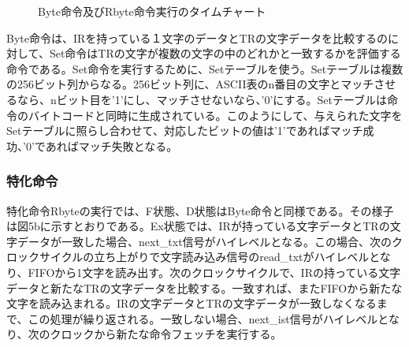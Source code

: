 \documentclass[submit,techrep]{ipsj}
\begin{document}
\begin{figure}[h]
       \caption{Byte命令及びRbyte命令実行のタイムチャート }
\end{figure}

Byte命令は、IRを持っている１文字のデータとTRの文字データを比較するのに対して、Set命令はTRの文字が複数の文字の中のどれかと一致するかを評価する命令である。Set命令を実行するために、Setテーブルを使う。Setテーブルは複数の256ビット列からなる。256ビット列に、ASCII表のn番目の文字とマッチさせるなら、nビット目を'1'にし、マッチさせないなら、'0'にする。Setテーブルは命令のバイトコードと同時に生成されている。このようにして、与えられた文字をSetテーブルに照らし合わせて、対応したビットの値は'1'であればマッチ成功、'0'であればマッチ失敗となる。\\

\subsubsection{特化命令}

特化命令Rbyteの実行では、F状態、D状態はByte命令と同様である。その様子は図5bに示すとおりである。Ex状態では、IRが持っている文字データとTRの文字データが一致した場合、next\_txt信号がハイレベルとなる。この場合、次のクロックサイクルの立ち上がりで文字読み込み信号のread\_txtがハイレベルとなり、FIFOから1文字を読み出す。次のクロックサイクルで、IRの持っている文字データと新たなTRの文字データを比較する。一致すれば、またFIFOから新たな文字を読み込まれる。IRの文字データとTRの文字データが一致しなくなるまで、この処理が繰り返される。一致しない場合、next\_ist信号がハイレベルとなり、次のクロックから新たな命令フェッチを実行する。
\end{document}
